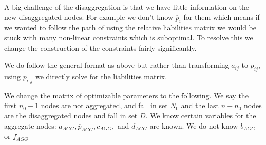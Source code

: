\documentclass{article}
\newcommand{\?}{\stackrel{?}{=}}
\newcommand{\pbar}{\overline{p}}
\begin{document}
A big challenge of the disaggregation is that we have little information on the new disaggregated nodes. For example we don't know $\pbar_i$ for them which means if we wanted to follow the path of using the relative liabilities matrix we would be stuck with many non-linear constraints which is suboptimal. To resolve this we change the construction of the constraints fairly significantly.

We do follow the general format as above but rather than transforming $a_{ij}$ to $\pbar_{ij}$, using $\pbar_{i,j}$ we directly solve for the liabilities matrix.

We change the matrix of optimizable parameters to the following. We say the first $n_0-1$ nodes are not aggregated, and fall in set $N_0$ and the last $n-n_0$ nodes are the disaggregated nodes and fall in set $D$. We know certain variables for the aggregate nodes: $a_{AGG}, \pbar_{AGG}, c_{AGG},$ and $d_{AGG}$ are known. We do not know $b_{AGG}$ or $f_{AGG}$
\end{document}

